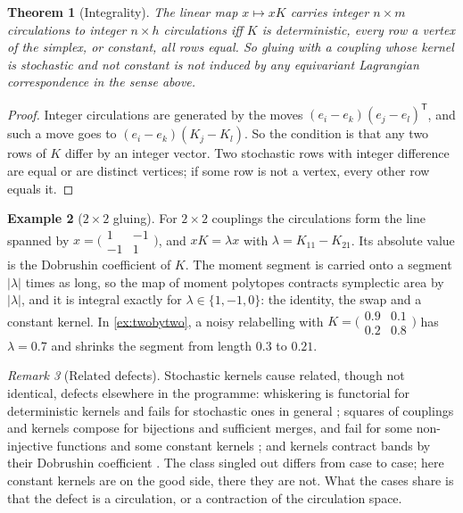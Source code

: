 \documentclass[11pt]{article}
\newtheorem{theorem}{Theorem}[section]
\theoremstyle{definition}
\newtheorem{example}[theorem]{Example}
\theoremstyle{remark}
\newtheorem{remark}[theorem]{Remark}
\newcommand{\T}{\mathsf T}
\begin{document}
\begin{theorem}[Integrality]\label{thm:integral}
The linear map $x\mapsto xK$ carries integer $n\times m$ circulations to integer $n\times h$ circulations iff $K$ is deterministic,
every row a vertex of the simplex, or constant, all rows equal. So gluing with a coupling whose kernel is stochastic and not constant
is not induced by any equivariant Lagrangian correspondence in the sense above.
\end{theorem}
\begin{proof}
Integer circulations are generated by the moves $(e_i-e_k)(e_j-e_l)^\T$, and such a move goes to $(e_i-e_k)(K_j-K_l)$. So the condition is
that any two rows of $K$ differ by an integer vector. Two stochastic rows with integer difference are equal or are distinct vertices;
if some row is not a vertex, every other row equals it.
\end{proof}

\begin{example}[$2\times2$ gluing]\label{ex:gluetwo}
For $2\times2$ couplings the circulations form the line spanned by $x=\bigl(\begin{smallmatrix}1&-1\\-1&1\end{smallmatrix}\bigr)$, and
$xK=\lambda x$ with $\lambda=K_{11}-K_{21}$. Its absolute value is the Dobrushin coefficient of $K$. The moment segment is carried onto a
segment $\lvert\lambda\rvert$ times as long, so the map of moment polytopes contracts symplectic area by $\lvert\lambda\rvert$, and it is integral
exactly for $\lambda\in\{1,-1,0\}$: the identity, the swap and a constant kernel. In \cref{ex:twobytwo}, a noisy relabelling with
$K=\bigl(\begin{smallmatrix}0.9&0.1\\0.2&0.8\end{smallmatrix}\bigr)$ has $\lambda=0.7$ and shrinks the segment from length $0.3$ to $0.21$.
\end{example}

\begin{remark}[Related defects]\label{rem:split}
Stochastic kernels cause related, though not identical, defects elsewhere in the programme: whiskering is functorial for
deterministic kernels and fails for stochastic ones in general \cite[Thm.~10.2]{Conditionals}; squares of couplings and kernels
compose for bijections and sufficient merges, and fail for some non-injective functions and some constant kernels
\cite[Prop.~6.1]{Algebras}; and kernels contract bands by their Dobrushin coefficient \cite{Bands}. The class singled out differs from
case to case; here constant kernels are on the good side, there they are not. What the cases share is that the defect is a
circulation, or a contraction of the circulation space.
\end{remark}
\end{document}
